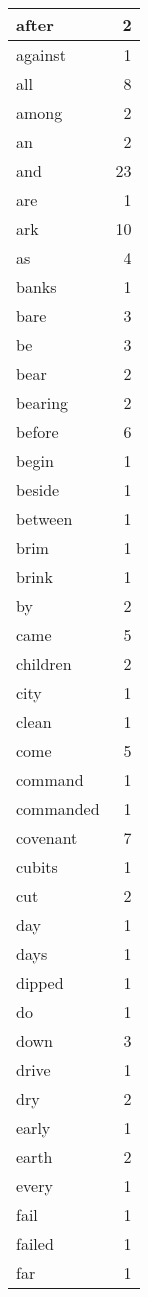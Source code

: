 \begin{center}
\begin{longtable}{l|r}
after & 2 \\ \hline
against & 1 \\ \hline
all & 8 \\ \hline
among & 2 \\ \hline
an & 2 \\ \hline
and & 23 \\ \hline
are & 1 \\ \hline
ark & 10 \\ \hline
as & 4 \\ \hline
banks & 1 \\ \hline
bare & 3 \\ \hline
be & 3 \\ \hline
bear & 2 \\ \hline
bearing & 2 \\ \hline
before & 6 \\ \hline
begin & 1 \\ \hline
beside & 1 \\ \hline
between & 1 \\ \hline
brim & 1 \\ \hline
brink & 1 \\ \hline
by & 2 \\ \hline
came & 5 \\ \hline
children & 2 \\ \hline
city & 1 \\ \hline
clean & 1 \\ \hline
come & 5 \\ \hline
command & 1 \\ \hline
commanded & 1 \\ \hline
covenant & 7 \\ \hline
cubits & 1 \\ \hline
cut & 2 \\ \hline
day & 1 \\ \hline
days & 1 \\ \hline
dipped & 1 \\ \hline
do & 1 \\ \hline
down & 3 \\ \hline
drive & 1 \\ \hline
dry & 2 \\ \hline
early & 1 \\ \hline
earth & 2 \\ \hline
every & 1 \\ \hline
fail & 1 \\ \hline
failed & 1 \\ \hline
far & 1 \\ \hline

\end{longtable}
\end{center}
